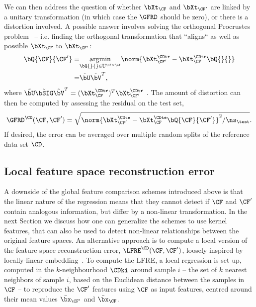 We can then address the question of whether $\bXt_{\CF}$ and $\bXt_{\CF^{\prime}}$ are linked by a unitary transformation (in which case the $\GFRD$ should be zero), or there is a distortion involved.
A possible answer involves solving the orthogonal Procrustes problem~\cite{scho66pm} -- i.e. finding the orthogonal transformation that ``aligns``  as well as possible $\bXt_{\CF}$ to $\bXt_{\CF^{\prime}}$:
\begin{equation}
\begin{split}
  \bQ{\CF}{\CF^{\prime}} =& \underset{\bQ{}{} \in \mathbb{U}^{\nf\times\nf}}{\operatorname{argmin}}
\norm{\bXt^{\CDtr}_{\CF^{\prime}} - \bXt^{\CDtr}_{\CF} \bQ{}{}  }\\
=&\tilde{\bU}\tilde{\bV}^T,
\end{split}\label{eq:proc-ff1}
\end{equation}
where $\tilde{\bU}\tilde{\bSIG}\tilde{\bV}^T = (\bXt_{\CF}^{\CDtr})^T \bXt^{\CDtr}_{\CF^{\prime}}$ .
The amount of distortion can then be computed by assessing the residual on the test set,
\begin{equation}
\GFRD^\CD(\CF,\CF^{\prime}) = \sqrt{{\norm{{\bXt}^{\CDte}_{\CF^{\prime}} - {\bXt}^{\CDte}_{\CF} \bQ{\CF}{\CF^{\prime}}  }^2}/\ns_\test}. \label{eq:GFRD}
\end{equation}
If desired, the error can be averaged over multiple random splits of the reference data set $\CD$.

\subsection{Local feature space reconstruction error}

A downside of the global feature comparison schemes introduced above is that the linear nature of the regression means that they cannot detect if $\CF$ and $\CF^{\prime}$ contain analogous information, but differ by a non-linear transformation.
In the next Section we discuss how one can generalize the schemes to use kernel features, that can also be used to detect non-linear relationships between the original feature spaces.
An alternative approach is to compute a local version of the feature space reconstruction error, $\LFRE^\CD(\CF,\CF^{\prime})$, loosely inspired by locally-linear embedding~\cite{rowe-saul00science}. 
To compute the LFRE, a local regression is set up, computed in the $k$-neighbourhood $\CDki$ around sample $i$  -- the set of $k$ nearest neighbors of sample $i$, based on the Euclidean distance between the samples in $\CF$ -- to reproduce the $\CF^{\prime}$ features using $\CF$ as input features, centred around their mean values $\bar{\bx}_{\CF^{\prime}}$ and $\bar{\bx}_{\CF}$.


